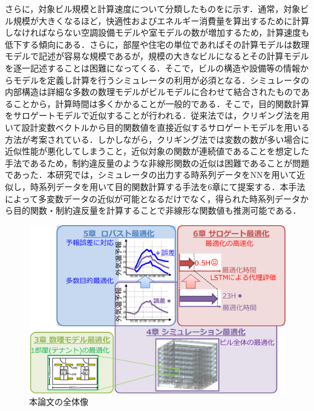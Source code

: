 さらに，対象ビル規模と計算速度について分類したものをに示す．通常，対象ビル規模が大きくなるほど，快適性およびエネルギー消費量を算出するために計算しなければならない空調設備モデルや室モデルの数が増加するため，計算速度も低下する傾向にある．さらに，部屋や住宅の単位であればその計算モデルは数理モデルで記述が容易な規模であるが，規模の大きなビルになるとその計算モデルを逐一記述することは困難になってくる．そこで，ビルの構造や設備等の情報からモデルを定義し計算を行うシミュレータの利用が必須となる．シミュレータの内部構造は詳細な多数の数理モデルがビルモデルに合わせて結合されたものであることから，計算時間は多くかかることが一般的である．そこで，目的関数計算をサロゲートモデルで近似することが行われる．従来法\cite{Tresidder12}では，クリギング法を用いて設計変数ベクトルから目的関数値を直接近似するサロゲートモデルを用いる方法が考案されている．しかしながら，クリギング法では変数の数が多い場合に近似性能が悪化してしまうこと，近似対象の関数が連続値であることを想定した手法であるため，制約違反量のような非線形関数の近似は困難であることが問題であった．本研究では，シミュレータの出力する時系列データをNNを用いて近似し，時系列データを用いて目的関数計算する手法を6章にて提案する．本手法によって多変数データの近似が可能となるだけでなく，得られた時系列データから目的関数・制約違反量を計算することで非線形な関数値も推測可能である．

\begin{figure}[ht]
    \begin{center}
        \includegraphics[width=1.0\textwidth,keepaspectratio=true]{fig/intro_bigpicture.eps}
    \end{center}
    \caption{本論文の全体像}
    \label{fig::intro_bigpicture}
\end{figure}

